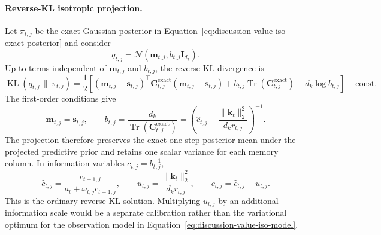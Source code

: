 \documentclass[11pt]{article}
\newcommand{\vct}[1]{\boldsymbol{#1}}
\begin{document}
\paragraph{Reverse-KL isotropic projection.}
Let $\pi_{t,j}$ be the exact Gaussian posterior in
Equation~\eqref{eq:discussion-value-iso-exact-posterior} and consider
\begin{equation}
  q_{t,j}
  =\mathcal{N}(\vct{m}_{t,j},b_{t,j}\vct{I}_{d_k}).
  \label{eq:discussion-value-iso-variational-family}
\end{equation}
Up to terms independent of $\vct{m}_{t,j}$ and $b_{t,j}$, the reverse KL divergence is
\begin{equation}
  \operatorname{KL}(q_{t,j}\,\|\,\pi_{t,j})
  =\frac{1}{2}\left[
    (\vct{m}_{t,j}-\vct{s}_{t,j})^\top
      \vct{C}_{t,j}^{\mathrm{exact}}
      (\vct{m}_{t,j}-\vct{s}_{t,j})
    +b_{t,j}\operatorname{Tr}(\vct{C}_{t,j}^{\mathrm{exact}})
    -d_k\log b_{t,j}
  \right]+\mathrm{const}.
  \label{eq:discussion-value-iso-kl}
\end{equation}
The first-order conditions give
\begin{equation}
  \vct{m}_{t,j}=\vct{s}_{t,j},
  \qquad
  b_{t,j}
  =\frac{d_k}{\operatorname{Tr}(\vct{C}_{t,j}^{\mathrm{exact}})}
  =\left(
    \widehat c_{t,j}
    +\frac{\|\vct{k}_t\|_2^2}{d_kr_{t,j}}
  \right)^{-1}.
  \label{eq:discussion-value-iso-variational-solution}
\end{equation}
The projection therefore preserves the exact one-step posterior mean under the projected
predictive prior and retains one scalar variance for each memory column. In information variables
$c_{t,j}=b_{t,j}^{-1}$,
\begin{equation}
  \widehat c_{t,j}
  =\frac{c_{t-1,j}}{a_t+\omega_{t,j}c_{t-1,j}},
  \qquad
  u_{t,j}=\frac{\|\vct{k}_t\|_2^2}{d_kr_{t,j}},
  \qquad
  c_{t,j}=\widehat c_{t,j}+u_{t,j}.
  \label{eq:discussion-value-iso-information-update}
\end{equation}
This is the ordinary reverse-KL solution. Multiplying $u_{t,j}$ by an additional information
scale would be a separate calibration rather than the variational optimum for the observation
model in Equation~\eqref{eq:discussion-value-iso-model}.
\end{document}
